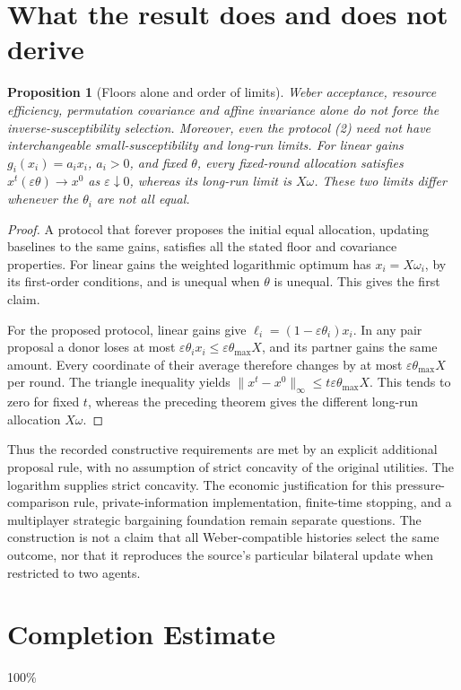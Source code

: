 \documentclass[11pt]{article}
\newtheorem{proposition}[theorem]{Proposition}
\theoremstyle{remark}\newtheorem{remark}[theorem]{Remark}
\begin{document}
\section*{What the result does and does not derive}
\begin{proposition}[Floors alone and order of limits]
Weber acceptance, resource efficiency, permutation covariance and affine invariance alone do not force the inverse-susceptibility selection. Moreover, even the protocol (2) need not have interchangeable small-susceptibility and long-run limits. For linear gains $g_i(x_i)=a_i x_i$, $a_i>0$, and fixed $\theta$, every fixed-round allocation satisfies $x^t(\varepsilon\theta)\to x^0$ as $\varepsilon\downarrow0$, whereas its long-run limit is $X\omega$. These two limits differ whenever the $\theta_i$ are not all equal.
\end{proposition}
\begin{proof}
A protocol that forever proposes the initial equal allocation, updating baselines to the same gains, satisfies all the stated floor and covariance properties. For linear gains the weighted logarithmic optimum has $x_i=X\omega_i$, by its first-order conditions, and is unequal when $\theta$ is unequal. This gives the first claim.

For the proposed protocol, linear gains give $\ell_i=(1-\varepsilon\theta_i)x_i$. In any pair proposal a donor loses at most $\varepsilon\theta_i x_i\le\varepsilon\theta_{\max}X$, and its partner gains the same amount. Every coordinate of their average therefore changes by at most $\varepsilon\theta_{\max}X$ per round. The triangle inequality yields $\|x^t-x^0\|_\infty\le t\varepsilon\theta_{\max}X$. This tends to zero for fixed $t$, whereas the preceding theorem gives the different long-run allocation $X\omega$.
\end{proof}

Thus the recorded constructive requirements are met by an explicit additional proposal rule, with no assumption of strict concavity of the original utilities. The logarithm supplies strict concavity. The economic justification for this pressure-comparison rule, private-information implementation, finite-time stopping, and a multiplayer strategic bargaining foundation remain separate questions. The construction is not a claim that all Weber-compatible histories select the same outcome, nor that it reproduces the source's particular bilateral update when restricted to two agents.

\section{Completion Estimate}
100\%
\end{document}
